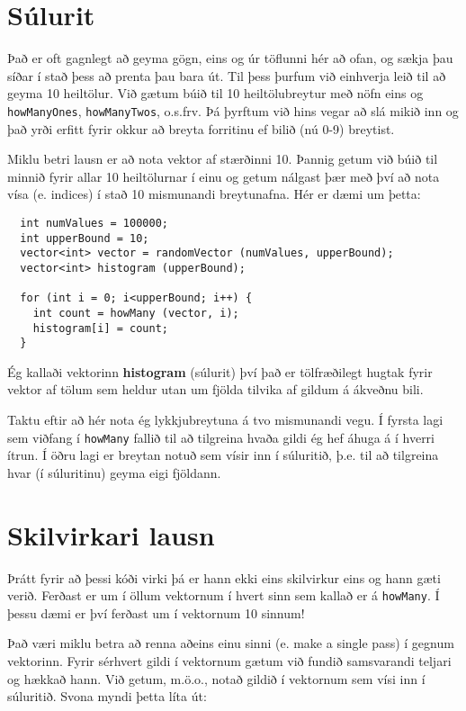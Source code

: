 \section {Súlurit}

Það er oft gagnlegt að geyma gögn, eins og úr töflunni hér að ofan, og sækja þau síðar í stað þess að prenta þau bara út.
Til þess þurfum við einhverja leið til að geyma 10 heiltölur.
Við gætum búið til 10 heiltölubreytur með nöfn eins og {\tt howManyOnes}, {\tt howManyTwos}, o.s.frv.
Þá þyrftum við hins vegar að slá mikið inn og það yrði erfitt fyrir okkur að breyta forritinu ef bilið (nú 0-9) breytist.

Miklu betri lausn er að nota vektor af stærðinni 10.
Þannig getum við búið til minnið fyrir allar 10 heiltölurnar í einu og getum nálgast þær með því að nota vísa (e. indices) í stað 10 mismunandi breytunafna.
Hér er dæmi um þetta:

\begin{verbatim}
  int numValues = 100000;
  int upperBound = 10;
  vector<int> vector = randomVector (numValues, upperBound);
  vector<int> histogram (upperBound);

  for (int i = 0; i<upperBound; i++) {
    int count = howMany (vector, i);
    histogram[i] = count;
  }
\end{verbatim}
%
Ég kallaði vektorinn {\bf histogram} (súlurit) því það er tölfræðilegt hugtak fyrir vektor af tölum sem heldur utan um fjölda tilvika af gildum á ákveðnu bili.


Taktu eftir að hér nota ég lykkjubreytuna á tvo mismunandi vegu.
Í fyrsta lagi sem viðfang í {\tt howMany} fallið til að tilgreina hvaða gildi ég hef áhuga á í hverri ítrun.
Í öðru lagi er breytan notuð sem vísir inn í súluritið, þ.e. til að tilgreina hvar (í súluritinu) geyma eigi fjöldann.

\section{Skilvirkari lausn}

Þrátt fyrir að þessi kóði virki þá er hann ekki eins skilvirkur eins og hann gæti verið.
Ferðast er um í öllum vektornum í hvert sinn sem kallað er á {\tt howMany}.
Í þessu dæmi er því ferðast um í vektornum 10 sinnum!

Það væri miklu betra að renna aðeins einu sinni (e. make a single pass) í gegnum vektorinn.
Fyrir sérhvert gildi í vektornum gætum við fundið samsvarandi teljari og hækkað hann.
Við getum, m.ö.o., notað gildið í vektornum sem vísi inn í súluritið.
Svona myndi þetta líta út:

